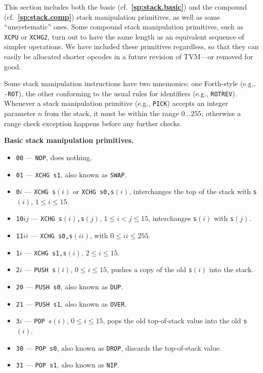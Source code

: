 \documentclass[12pt,oneside]{article}
\def\makepoint#1{\medbreak\noindent{\bf #1.\ }}
\def\nxsubpoint{\refstepcounter{subsubsection}%
  \smallbreak\makepoint{\thesubsubsection}}
\def\refpoint#1{{\rm\textbf{\ref{#1}}}}
\let\ptref=\refpoint
\def\emb#1{\textbf{#1.}}
\begin{document}
This section includes both the basic (cf.~\ptref{sp:stack.basic}) and the compound (cf.~\ptref{sp:stack.comp}) stack manipulation primitives, as well as some ``unsystematic'' ones. Some compound stack manipulation primitives, such as {\tt XCPU} or {\tt XCHG2}, turn out to have the same length as an equivalent sequence of simpler operations. We have included these primitives regardless, so that they can easily be allocated shorter opcodes in a future revision of TVM---or removed for good.

Some stack manipulation instructions have two mnemonics: one Forth-style (e.g., {\tt -ROT}), the other conforming to the usual rules for identifiers (e.g., {\tt ROTREV}). Whenever a stack manipulation primitive (e.g., {\tt PICK}) accepts an integer parameter $n$ from the stack, it must be within the range $0\dots255$; otherwise a range check exception happens before any further checks.

\nxsubpoint\emb{Basic stack manipulation primitives}
\begin{itemize}
\item {\tt 00} --- {\tt NOP}, does nothing.
\item {\tt 01} --- {\tt XCHG s1}, also known as {\tt SWAP}.
\item {\tt 0$i$} --- {\tt XCHG s$(i)$} or {\tt XCHG s0,s$(i)$}, interchanges the top of the stack with {\tt s$(i)$}, $1\leq i\leq 15$.
\item {\tt 10$ij$} --- {\tt XCHG s$(i)$,s$(j)$}, $1\leq i<j\leq15$, interchanges {\tt s$(i)$} with {\tt s$(j)$}.
\item {\tt 11$ii$} --- {\tt XCHG s0,s$(ii)$}, with $0\leq ii\leq255$.
\item {\tt 1$i$} --- {\tt XCHG s1,s$(i)$}, $2\leq i\leq 15$.
\item {\tt 2$i$} --- {\tt PUSH s$(i)$}, $0\leq i\leq 15$, pushes a copy of the old {\tt s$(i)$} into the stack.
\item {\tt 20} --- {\tt PUSH s0}, also known as {\tt DUP}.
\item {\tt 21} --- {\tt PUSH s1}, also known as {\tt OVER}.
\item {\tt 3$i$} --- {\tt POP $s(i)$}, $0\leq i\leq 15$, pops the old top-of-stack value into the old {\tt s$(i)$}.
\item {\tt 30} --- {\tt POP s0}, also known as {\tt DROP}, discards the top-of-stack value.
\item {\tt 31} --- {\tt POP s1}, also known as {\tt NIP}.
\end{itemize}
\end{document}
